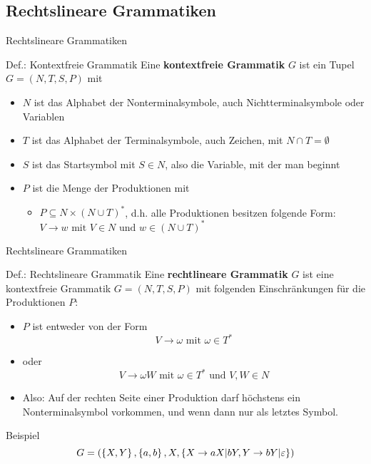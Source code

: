 \subsection{Rechtslineare Grammatiken}

\begin{frame}{Rechtslineare Grammatiken}
\begin{block}{Def.: Kontextfreie Grammatik}
	Eine \textbf{kontextfreie Grammatik} $G$ ist ein Tupel $G = (N,T,S,P)$ mit
	\begin{itemize}
		\item $N$ ist das Alphabet der Nonterminalsymbole, auch Nichtterminalsymbole oder Variablen
		\item $T$ ist das Alphabet der Terminalsymbole, auch Zeichen, mit $N \cap T = \emptyset$
		\item $S$ ist das Startsymbol mit $S \in N$, also die Variable, mit der man beginnt
		\item $P$ ist die Menge der Produktionen mit
			\begin{itemize}
				\item $P \subseteq N \times (N \cup T)^*$, d.h. alle Produktionen besitzen folgende Form:\\
				$V \to w \text{ mit } V \in N \text{ und } w \in (N \cup T)^*$
			\end{itemize}
	\end{itemize}
\end{block}
\end{frame}

\begin{frame}{Rechtslineare Grammatiken}
\begin{block}{Def.: Rechtslineare Grammatik}
	Eine \textbf{rechtlineare Grammatik} $G$ ist eine kontextfreie Grammatik $G = (N,T,S,P)$ mit folgenden Einschränkungen für die Produktionen $P$:\\
	\begin{itemize}
			\item $P$ ist entweder von der Form \[
		V \to \omega \text{ mit } \omega \in T^*
	\]
	\item oder \[
		V \to \omega W \text{ mit } \omega \in T^* \text{ und } V,W \in N
	\]
	\item Also: Auf der rechten Seite einer Produktion darf höchstens ein Nonterminalsymbol vorkommen, und wenn dann nur als letztes Symbol.
	\end{itemize}
\end{block}
\pause
\begin{exampleblock}{Beispiel}
	\[
		G = (\left\{ X,Y \right\}, \left\{ a,b \right\}, X, \left\{ X \to aX | bY, Y \to bY | \varepsilon \right\})
	\]
\end{exampleblock}
\end{frame}

